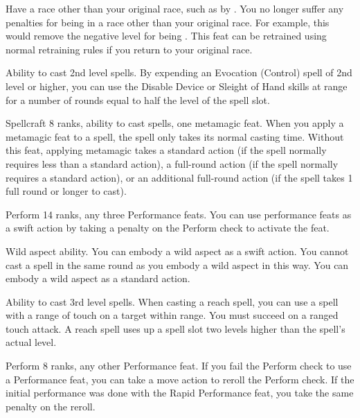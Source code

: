 \label{Racial Acclimation}
\featpre Have a race other than your original race, such as by .
\featben You no longer suffer any penalties for being in a race other than your original race. For example, this would remove the negative level for being .
 This feat can be retrained using normal retraining rules if you return to your original race.

 Ability to cast 2nd level spells.
 By expending an Evocation (Control) spell of 2nd level or higher, you can use the Disable Device or Sleight of Hand skills at \rngclose range for a number of rounds equal to half the level of the spell slot.

 Spellcraft 8 ranks, ability to cast spells, one metamagic feat.
 When you apply a metamagic feat to a spell, the spell only takes its normal casting time.
 Without this feat, applying metamagic takes a standard action (if the spell normally requires less than a standard action), a full-round action (if the spell normally requires a standard action), or an additional full-round action (if the spell takes 1 full round or longer to cast).

\featpre Perform 14 ranks, any three Performance feats.
\featben You can use performance feats as a swift action by taking a  penalty on the Perform check to activate the feat.

\featpre Wild aspect ability.
\featben You can embody a wild aspect as a swift action. You cannot cast a spell in the same round as you embody a wild aspect in this way.
 You can embody a wild aspect as a standard action.

 Ability to cast 3rd level spells.
 When casting a reach spell, you can use a spell with a range of touch on a target within \rngclose range. You must succeed on a ranged touch attack. A reach spell uses up a spell slot two levels higher than the spell's actual level.

\featpre Perform 8 ranks, any other Performance feat.
\featben If you fail the Perform check to use a Performance feat, you can take a move action to reroll the Perform check. If the initial performance was done with the Rapid Performance feat, you take the same  penalty on the reroll.

